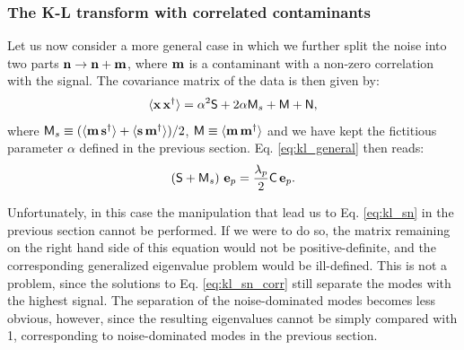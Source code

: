 \documentclass[twocolumn,amsfont,amssymb,amsmath, showpacs,balancelastpage, nofootinbib]{revtex4-1}
\begin{document}
    \subsubsection{The K-L transform with correlated contaminants}\label{sssec:method.klbasis.cr}
      Let us now consider a more general case in which we further split the noise into two parts ${\bf n}\rightarrow{\bf n}+{\bf m}$, where ${\bf m}$ is a contaminant with a non-zero correlation with the signal. The covariance matrix of the data is then given by:
      \begin{equation}
        \langle{\bf x}\,{\bf x}^\dag\rangle=\alpha^2{\sf S}+2\alpha{\sf M}_s+{\sf M}+{\sf N},
      \end{equation}
      where ${\sf M}_s\equiv(\langle{\bf m}\,{\bf s}^\dag\rangle+\langle{\bf s}\,{\bf m}^\dag\rangle)/2$, ${\sf M}\equiv\langle{\bf m}\,{\bf m}^\dag\rangle$ and we have kept the fictitious parameter $\alpha$ defined in the previous section.
      Eq. \ref{eq:kl_general} then reads:
      \begin{equation}\label{eq:kl_sn_corr}
        \left({\sf S}+{\sf M}_s\right)\,{\bf e}_p=
        \frac{\lambda_p}{2}{\sf C}\,{\bf e}_p.
      \end{equation}
      
      Unfortunately, in this case the manipulation that lead us to Eq. \ref{eq:kl_sn} in the previous section cannot be performed. If we were to do so, the matrix remaining on the right hand side of this equation would not be positive-definite, and the corresponding generalized eigenvalue problem would be ill-defined. This is not a problem, since the solutions to Eq. \ref{eq:kl_sn_corr} still separate the modes with the highest signal. The separation of the noise-dominated modes becomes less obvious, however, since the resulting eigenvalues cannot be simply compared with 1, corresponding to noise-dominated modes in the previous section.
      
\end{document}
